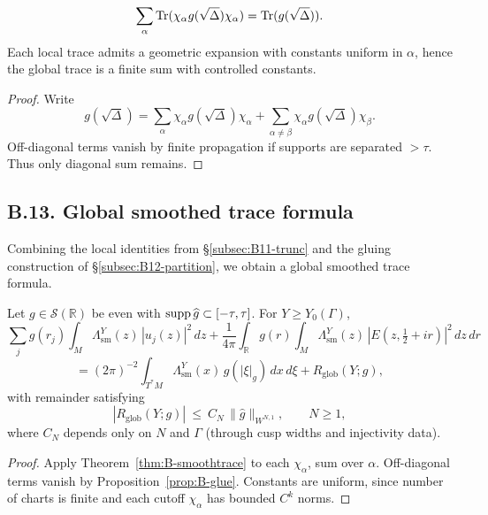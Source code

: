 \begin{proposition}
\label{prop:B-glue}
\[
\sum_\alpha \operatorname{Tr}(\chi_\alpha g(\sqrt\Delta)\chi_\alpha)
=\operatorname{Tr}(g(\sqrt\Delta)).
\]
Each local trace admits a geometric expansion with constants uniform in $\alpha$,
hence the global trace is a finite sum with controlled constants.
\end{proposition}

\begin{proof}
Write
\[
g(\sqrt\Delta)=\sum_\alpha \chi_\alpha g(\sqrt\Delta)\chi_\alpha
+\sum_{\alpha\ne\beta}\chi_\alpha g(\sqrt\Delta)\chi_\beta.
\]
Off-diagonal terms vanish by finite propagation if supports are separated $>\tau$.
Thus only diagonal sum remains.
\end{proof}


\subsection*{B.13. Global smoothed trace formula}
\label{subsec:B13-global}

Combining the local identities from \S\ref{subsec:B11-trunc} and the gluing
construction of \S\ref{subsec:B12-partition}, we obtain a global smoothed
trace formula.

\begin{theorem}
\label{thm:B-globaltrace}
Let $g\in \mathcal S(\mathbb R)$ be even with $\operatorname{supp}\widehat g\subset[-\tau,\tau]$.
For $Y\ge Y_0(\Gamma)$,
\[
\sum_j g(r_j)\int_M \Lambda^Y_{\mathrm{sm}}(z)\,|u_j(z)|^2\,dz
+ \frac{1}{4\pi}\int_{\mathbb R} g(r)\int_M \Lambda^Y_{\mathrm{sm}}(z)\,|E(z,\tfrac12+ir)|^2\,dz\,dr
\]
\[
=(2\pi)^{-2}\int_{T^*M} \Lambda^Y_{\mathrm{sm}}(x)\,g(|\xi|_g)\,dx\,d\xi
+R_{\mathrm{glob}}(Y;g),
\]
with remainder satisfying
\[
|R_{\mathrm{glob}}(Y;g)| \ \le\ C_N\,\|\widehat g\|_{W^{N,1}},\qquad N\ge1,
\]
where $C_N$ depends only on $N$ and $\Gamma$ (through cusp widths and injectivity data).
\end{theorem}

\begin{proof}
Apply Theorem~\ref{thm:B-smoothtrace} to each $\chi_\alpha$, sum over $\alpha$.
Off-diagonal terms vanish by Proposition~\ref{prop:B-glue}. Constants are uniform,
since number of charts is finite and each cutoff $\chi_\alpha$ has bounded $C^k$ norms.
\end{proof}

